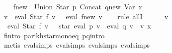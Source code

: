 \begin{isabellebody}
\ \ \isamarkupfalse%
\ {\isacharquery}{\kern0pt}f{\isacharunderscore}{\kern0pt}new\ {\isacharequal}{\kern0pt}\ {\isachardoublequoteopen}Union\ {\isacharparenleft}{\kern0pt}Star\ p{\isacharparenright}{\kern0pt}\ {\isacharparenleft}{\kern0pt}Concat\ {\isacharquery}{\kern0pt}q{\isacharunderscore}{\kern0pt}new\ {\isacharparenleft}{\kern0pt}Var\ x{\isacharparenright}{\kern0pt}{\isacharparenright}{\kern0pt}{\isachardoublequoteclose}\isanewline
\ \ \isamarkupfalse%
\ {\isachardoublequoteopen}{\isasymforall}v{\isachardot}{\kern0pt}\ {\isacharparenleft}{\kern0pt}{\isasymPsi}\ {\isacharparenleft}{\kern0pt}eval\ {\isacharparenleft}{\kern0pt}Star\ f{\isacharparenright}{\kern0pt}\ v{\isacharparenright}{\kern0pt}\ {\isacharequal}{\kern0pt}\ {\isasymPsi}\ {\isacharparenleft}{\kern0pt}eval\ {\isacharquery}{\kern0pt}f{\isacharunderscore}{\kern0pt}new\ v{\isacharparenright}{\kern0pt}{\isacharparenright}{\kern0pt}{\isachardoublequoteclose}\isanewline
\ \ \isamarkupfalse%
\ {\isacharparenleft}{\kern0pt}rule\ allI{\isacharparenright}{\kern0pt}\isanewline
\ \ \ \ \isamarkupfalse%
\ v\isanewline
\ \ \ \ \isamarkupfalse%
\ {\isachardoublequoteopen}{\isasymPsi}\ {\isacharparenleft}{\kern0pt}eval\ {\isacharparenleft}{\kern0pt}Star\ f{\isacharparenright}{\kern0pt}\ v{\isacharparenright}{\kern0pt}\ {\isacharequal}{\kern0pt}\ {\isasymPsi}\ {\isacharparenleft}{\kern0pt}star\ {\isacharparenleft}{\kern0pt}eval\ p\ v\ {\isasymunion}\ eval\ q\ v\ {\isacharat}{\kern0pt}{\isacharat}{\kern0pt}\ v\ x{\isacharparenright}{\kern0pt}{\isacharparenright}{\kern0pt}{\isachardoublequoteclose}\isanewline
\ \ \ \ \ \ \isamarkupfalse%
\ f{\isacharprime}{\kern0pt}{\isacharunderscore}{\kern0pt}intro\ parikh{\isacharunderscore}{\kern0pt}star{\isacharunderscore}{\kern0pt}mono{\isacharunderscore}{\kern0pt}eq\ p{\isacharunderscore}{\kern0pt}q{\isacharunderscore}{\kern0pt}intro\isanewline
\ \ \ \ \ \ \isamarkupfalse%
\ {\isacharparenleft}{\kern0pt}metis\ eval{\isachardot}{\kern0pt}simps{\isacharparenleft}{\kern0pt}{}{\isacharparenright}{\kern0pt}\ eval{\isachardot}{\kern0pt}simps{\isacharparenleft}{\kern0pt}{}{\isacharparenright}{\kern0pt}\ eval{\isachardot}{\kern0pt}simps{\isacharparenleft}{\kern0pt}{}{\isacharparenright}{\kern0pt}\ eval{\isachardot}{\kern0pt}simps{\isacharparenleft}{\kern0pt}{}{\isacharparenright}{\kern0pt}{\isacharparenright}{\kern0pt}\isanewline
\ \ \ \ \isamarkupfalse%
\ \isamarkupfalse%

\end{isabellebody}
